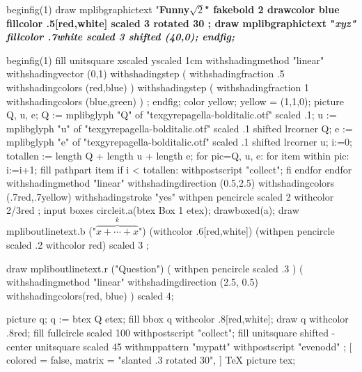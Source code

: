 \mplibcode
beginfig(1) %
draw mplibgraphictext "\bf Funny$\sqrt{2}$"
  fakebold 2 %
  drawcolor blue fillcolor .5[red,white]
  scaled 3 rotated 30 ;
draw mplibgraphictext "\it xyz"
  fillcolor .7white
  scaled 3 shifted (40,0);
endfig;
\endmplibcode
\par
\mplibcode
beginfig(1)
fill unitsquare xscaled \mpdim\hsize yscaled 1cm
    withshadingmethod "linear"
    withshadingvector (0,1)
    withshadingstep (
       withshadingfraction .5
       withshadingcolors (red,blue)
    )
    withshadingstep (
       withshadingfraction 1
       withshadingcolors (blue,green)
    )
    ;
endfig;
\endmplibcode
\leavevmode
\mpfig
color yellow; yellow = (1,1,0);
picture Q, u, e;
Q := mplibglyph "Q" of "texgyrepagella-bolditalic.otf" scaled .1;
u := mplibglyph "u" of "texgyrepagella-bolditalic.otf" scaled .1 shifted lrcorner Q;
e := mplibglyph "e" of "texgyrepagella-bolditalic.otf" scaled .1 shifted lrcorner u;
i:=0;
totallen := length Q + length u + length e;
for pic=Q, u, e:
  for item within pic:
    i:=i+1;
    fill pathpart item
    if i < totallen: withpostscript "collect"; fi
  endfor
endfor
  withshadingmethod "linear"
  withshadingdirection (0.5,2.5)
  withshadingcolors (.7red,.7yellow)
  withshadingstroke "yes"
  withpen pencircle scaled 2 withcolor 2/3red
  ;
\endmpfig
{}%
\mpfig* input boxes \endmpfig
\mpfig circleit.a(btex Box 1 etex); drawboxed(a); \endmpfig
\def\mpfiginstancename{mympfig}%
\mpfig
draw mpliboutlinetext.b ("$\overbrace{x+\cdots+x}^k$")
    (withcolor .6[red,white])
    (withpen pencircle scaled .2 withcolor red)
    scaled 3 ;
\endmpfig
\par
\mpfig
  draw mpliboutlinetext.r
    ("Question")
    ( withpen pencircle scaled .3 )
    (
      withshadingmethod "linear"
      withshadingdirection (2.5, 0.5)
      withshadingcolors(red, blue)
    )
    scaled 4;
\endmpfig
\par\leavevmode
{}
  \mpfig
    picture q;
    q := btex Q etex;
    fill bbox q withcolor .8[red,white];
    draw q withcolor .8red;
  \endmpfig
\endmppattern
\mpfig
  fill fullcircle scaled 100 withpostscript "collect";
  fill unitsquare shifted - center unitsquare scaled 45
    withmppattern "mypatt"
    withpostscript "evenodd"
    ;
\endmpfig
{}
  [
    colored = false,
    matrix = "slanted .3 rotated 30",
  ]
  \fiverm\TeX
\endmppattern
\mpfig
  picture tex;
